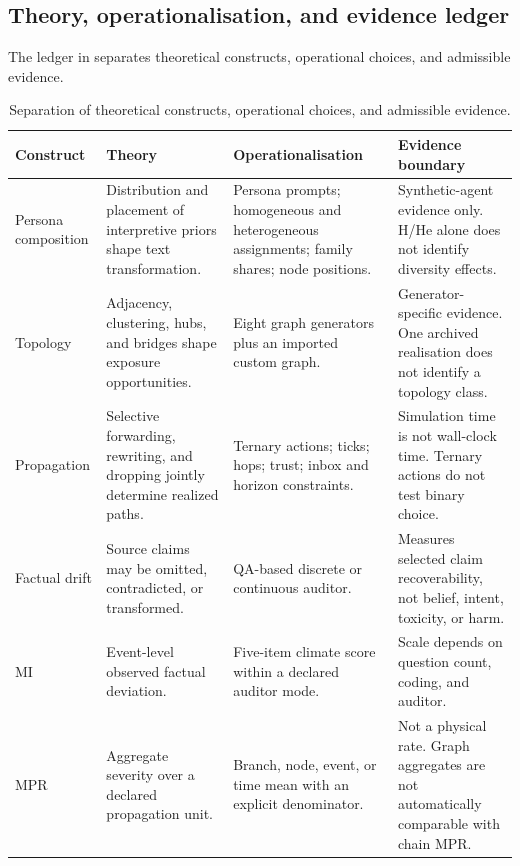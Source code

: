 \subsection{Theory, operationalisation, and evidence ledger}
\label{subsec:theory-ledger}

The ledger in  separates theoretical
constructs, operational choices, and admissible evidence.

\begin{table}[tbp]
\centering
\caption{Separation of theoretical constructs, operational choices, and admissible evidence.}
\label{tab:theory-operation-evidence}
\scriptsize
\begin{tabular}{p{}p{}p{}p{}}
\toprule
Construct & Theory & Operationalisation & Evidence boundary \\
\midrule
Persona composition
& Distribution and placement of interpretive priors shape text transformation.
& Persona prompts; homogeneous and heterogeneous assignments; family shares; node positions.
& Synthetic-agent evidence only. H/He alone does not identify diversity effects. \\

Topology
& Adjacency, clustering, hubs, and bridges shape exposure opportunities.
& Eight graph generators plus an imported custom graph.
& Generator-specific evidence. One archived realisation does not identify a topology class. \\

Propagation
& Selective forwarding, rewriting, and dropping jointly determine realized paths.
& Ternary actions; ticks; hops; trust; inbox and horizon constraints.
& Simulation time is not wall-clock time. Ternary actions do not test binary choice. \\

Factual drift
& Source claims may be omitted, contradicted, or transformed.
& QA-based discrete or continuous auditor.
& Measures selected claim recoverability, not belief, intent, toxicity, or harm. \\

MI
& Event-level observed factual deviation.
& Five-item climate score within a declared auditor mode.
& Scale depends on question count, coding, and auditor. \\

MPR
& Aggregate severity over a declared propagation unit.
& Branch, node, event, or time mean with an explicit denominator.
& Not a physical rate. Graph aggregates are not automatically comparable with chain MPR. \\


\end{tabular}
\end{table}
